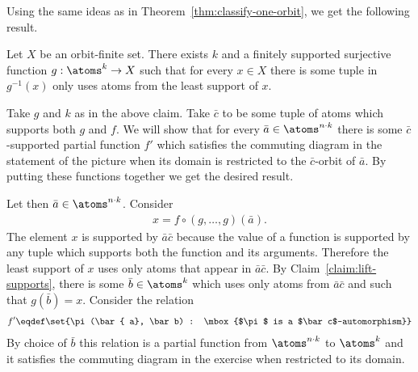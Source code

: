 {Using the same ideas as in Theorem~\ref{thm:classify-one-orbit}, we get the following result.


\begin{claim}\label{claim:lift-supports} Let $X$ be an orbit-finite set. There exists $k$ and a finitely supported surjective function $g : \atoms^k \to X$ such that for every $x \in X$ there is some tuple in $g^{-1}(x)$ only uses atoms from the least support of $x$.
\end{claim}
	

Take $g$ and $k$ as in the above claim. Take $\bar c$ to be some tuple of atoms which supports both $g$ and $f$. We will show that for every $\bar a \in \atoms ^{n \cdot k}$ there is some $\bar c$-supported partial function $f'$ which satisfies the commuting diagram in the statement of the picture when its domain is restricted to the $\bar c$-orbit of $\bar a$. By putting these functions together we get the desired result. 
 
 
Let then $\bar a \in \atoms^{n \cdot k}$. Consider
\begin{align*}
 x = f \circ (g,\ldots,g) (\bar a).
\end{align*}
The element $x$ is supported by $\bar a \bar c$ because the value of a function is supported by any tuple which supports both the function and its arguments. Therefore the least support of $x$ uses only atoms that appear in $\bar a \bar c$. By Claim~\ref{claim:lift-supports}, there is some $\bar b \in \atoms^k$ which uses only atoms from $ \bar a \bar c$ and such that $g(\bar b) = x.$ Consider the relation
\begin{align*}
 f' \eqdef \set{\pi(\bar { a}, \bar b) : \mbox{$\pi$ is a $\bar c$-automorphism}}
\end{align*}
By choice of $\bar b$ this relation is a partial function from $\atoms^{n \cdot k}$ to $\atoms^k$ and it satisfies the commuting diagram in the exercise when restricted to its domain. }



